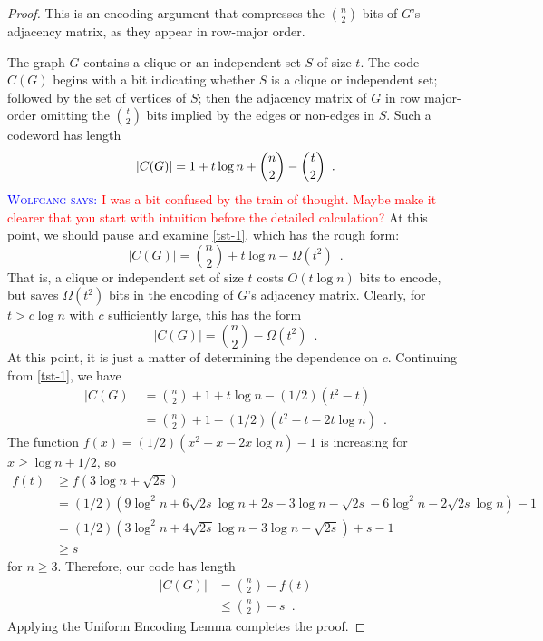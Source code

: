 \documentclass{patmorin}
\newcommand{\aremark}[3]{\textcolor{blue}{\textsc{#1 #2:}}
  \textcolor{red}{\textsf{#3}}}
\newcommand{\wolfgang}[2][says]{\aremark{Wolfgang}{#1}{#2}}
\begin{document}
\begin{proof}
  This is an encoding argument that compresses the $\binom{n}{2}$ bits
  of $G$'s adjacency matrix, as they appear in row-major order.
  
  The graph $G$ contains a clique or an independent set $S$ of size
  $t$. The code $C(G)$ begins with a bit indicating whether $S$
  is a clique or independent set; followed by the set of vertices of $S$; 
  then the
  adjacency matrix of $G$ in row major-order omitting
  the $\binom{t}{2}$ bits implied by the edges or non-edges in
  $S$. Such a codeword has length
  \begin{equation} 
    |C(G)|  = 1 + t\log n + \binom{n}{2}-\binom{t}{2} \enspace .  \eqlabel{tst-1}
  \end{equation}
  \wolfgang{I was a bit confused by the train of thought. Maybe 
    make it clearer that you start with intuition before the
    detailed calculation?}
  At this point, we should pause and examine \eqref{tst-1}, which has
  the rough form:
  \[ |C(G)|  = \binom{n}{2} + t\log n - \Omega(t^2) \enspace . \]
  That is, a clique or independent set of size $t$ costs $O(t\log n)$ bits
  to encode, but saves $\Omega(t^2)$ bits in the encoding of $G$'s 
  adjacency matrix.
  Clearly, for $t>c\log n$ with $c$ sufficiently large, this has the form 
  \[ |C(G)|  = \binom{n}{2} - \Omega(t^2) \enspace . \]
  At this point, it is just a matter of determining the dependence on $c$.
  Continuing from \eqref{tst-1}, we have
  \begin{align*}
    |C(G)| 
    & = \binom{n}{2} + 1 + t\log n - (1/2)(t^2 - t) \\
    & = \binom{n}{2} + 1 - (1/2)(t^2 - t - 2t \log n) \enspace .
  \end{align*}
  The function $f(x) = (1/2)(x^2 - x - 2x \log n) - 1$ is increasing
  for $x \geq \log n + 1/2$, so
  \begin{align*}
    f(t) &\ge f(3\log n + \sqrt{2s}) \\
    &= (1/2)(9 \log^2 n + 6 \sqrt{2s} \log n + 2s - 3 \log n - \sqrt{2s} - 6 \log^2 n - 2 \sqrt{2s} \log n) - 1 \\
    &= (1/2)(3 \log^2 n + 4 \sqrt{2s} \log n - 3 \log n - \sqrt{2s}) + s - 1 \\
    &\ge s
  \end{align*}
  for $n \ge 3$. Therefore, our code has length
  \begin{align*}
    |C(G)| & = \binom{n}{2} - f(t) \\
    & \le \binom{n}{2} - s \enspace .
  \end{align*}
  Applying the Uniform Encoding Lemma completes the proof.
\end{proof}
\end{document}

